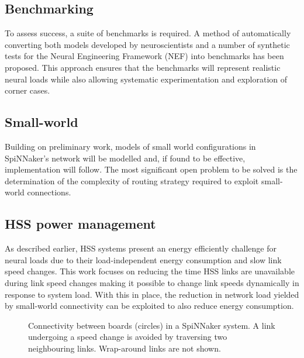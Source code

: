 	\subsection{Benchmarking}
		
		To assess success, a suite of benchmarks is required. A method of
		automatically converting both models developed by neuroscientists and a
		number of synthetic tests for the Neural Engineering Framework (NEF)
		\cite{eliasmith04} into benchmarks has been proposed. This approach ensures
		that the benchmarks will represent realistic neural loads while also
		allowing systematic experimentation and exploration of corner cases.
	
	\subsection{Small-world}
		
		Building on preliminary work, models of small world configurations in
		SpiNNaker's network will be modelled and, if found to be effective,
		implementation will follow. The most significant open problem to be solved
		is the determination of the complexity of routing strategy required to
		exploit small-world connections.
	
	\subsection{HSS power management}
		
		As described earlier, HSS systems present an energy efficiently challenge
		for neural loads due to their load-independent energy consumption and slow
		link speed changes. This work focuses on reducing the time HSS links are
		unavailable during link speed changes making it possible to change link
		speeds dynamically in response to system load. With this in place, the
		reduction in network load yielded by small-world connectivity can be
		exploited to also reduce energy consumption.
		
		\begin{figure}
			\center
			
			
			\caption{Connectivity between boards (circles) in a SpiNNaker system. A
			link undergoing a speed change is avoided by traversing two neighbouring
			links.  Wrap-around links are not shown.}
			\label{fig:emergency-routing}
		\end{figure}
		
